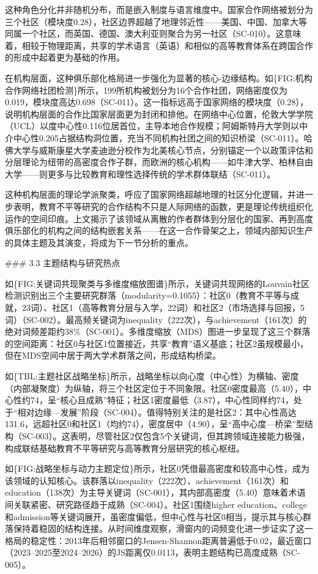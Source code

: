 \documentclass[12pt,a4paper]{article}
\begin{document}
这种角色分化并非随机分布，而是嵌入制度与语言维度中。国家合作网络被划分为三个社区（模块度0.28），社区边界超越了地理邻近性——美国、中国、加拿大等同属一个社区，而英国、德国、澳大利亚则聚合为另一社区（SC-010）。这意味着，相较于物理距离，共享的学术语言（英语）和相似的高等教育体系在跨国合作的形成中起着更为基础的作用。

在机构层面，这种俱乐部化格局进一步强化为显著的核心-边缘结构。如\{FIG:机构合作网络社团检测\}所示，199所机构被划分为16个合作社团，网络密度仅为0.019，模块度高达0.698（SC-011）。这一指标远高于国家网络的模块度（0.28），说明机构层面的合作比国家层面更为封闭和排他。在网络中心位置，伦敦大学学院（UCL）以度中心性0.116位居首位，主导本地合作规模；阿姆斯特丹大学则以中介中心性0.205占据结构洞位置，充当不同机构社团之间的知识桥梁（SC-011）。哈佛大学与威斯康星大学麦迪逊分校作为北美核心节点，分别锚定一个以政策评估和分层理论为纽带的高密度合作子群，而欧洲的核心机构——如牛津大学、柏林自由大学——则更多与比较教育和理性选择传统的学术群体联结（SC-011）。

这种机构层面的理论学派聚类，呼应了国家网络超越地理的社区分化逻辑，并进一步表明，教育不平等研究的合作结构不只是人际网络的函数，更是理论传统组织化运作的空间印痕。上文揭示了该领域从离散的作者群体到分层化的国家、再到高度俱乐部化的机构之间的结构嵌套关系——在这一合作骨架之上，领域内部知识生产的具体主题及其演变，将成为下一节分析的重点。

\#\#\# 3.3 主题结构与研究热点

如\{FIG:关键词共现聚类与多维度缩放图谱\}所示，关键词共现网络的Louvain社区检测识别出三个主要研究群落（modularity=0.1055）：社区0（教育不平等与成就，23词）、社区1（高等教育分层与入学，22词）和社区2（市场选择与回报，5词）（SC-002）。最高频关键词为inequality（222次），与achievement（161次）的绝对词频差距约38\%（SC-001）。多维度缩放（MDS）图进一步呈现了这三个群落的空间距离：社区0与社区1位置接近，共享“教育”语义基底；社区2虽规模最小，但在MDS空间中居于两大学术群落之间，形成结构桥梁。

如\{TBL:主题社区战略坐标\}所示，战略坐标以向心度（中心性）为横轴、密度（内部凝聚度）为纵轴，将三个社区定位于不同象限。社区0密度最高（5.40），中心性约74，呈“核心且成熟”特征；社区1密度最低（3.87），中心性同样约74，处于“相对边缘—发展”阶段（SC-004）。值得特别关注的是社区2：其中心性高达131.6，远超社区0和社区1（均约74），密度居中（4.90），呈“高中心度—桥梁”型结构（SC-003）。这表明，尽管社区2仅包含5个关键词，但其跨领域连接能力极强，构成联结基础教育不平等研究与高等教育分层研究的核心枢纽。

如\{FIG:战略坐标与动力主题定位\}所示，社区0凭借最高密度和较高中心性，成为该领域的认知核心。该群落以inequality（222次）、achievement（161次）和education（138次）为主导关键词（SC-001），其内部高密度（5.40）意味着术语间关联紧密、研究路径趋于成熟（SC-004）。社区1围绕higher education、college和admission等关键词展开，虽密度偏低，但中心性与社区0相当，提示其与核心群落保持着稳固的结构连接。从时间维度观察，滑窗内的词频变化进一步证实了这一格局的稳定性：2013年后相邻窗口的Jensen-Shannon距离普遍低于0.02，最近窗口（2023–2025至2024–2026）的JS距离仅0.0113，表明主题结构已高度成熟（SC-005）。
\end{document}
